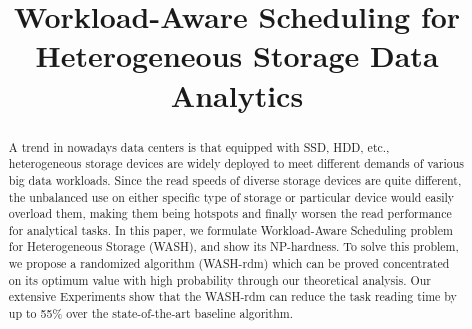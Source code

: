 \documentclass[conference]{IEEEtran}
\begin{document}
\title{Workload-Aware Scheduling for Heterogeneous Storage Data Analytics\\
}

\author{
}


\maketitle

\begin{abstract}
A trend in nowadays data centers is that equipped with SSD, HDD, etc., heterogeneous storage devices are widely deployed to meet different demands of various big data workloads. Since the read speeds of diverse storage devices are quite different, the unbalanced use on either specific type of storage or particular device would easily overload them, making them being hotspots and finally worsen the read performance for analytical tasks. In this paper, we formulate Workload-Aware Scheduling problem for Heterogeneous Storage (WASH), and show its NP-hardness. To solve this problem, we propose a randomized algorithm (WASH-rdm) which can be proved concentrated on its optimum value with high probability through our theoretical analysis. Our extensive Experiments show that the WASH-rdm can reduce the task reading time by up to 55\% over the state-of-the-art baseline algorithm.


\end{abstract}
\end{document}
